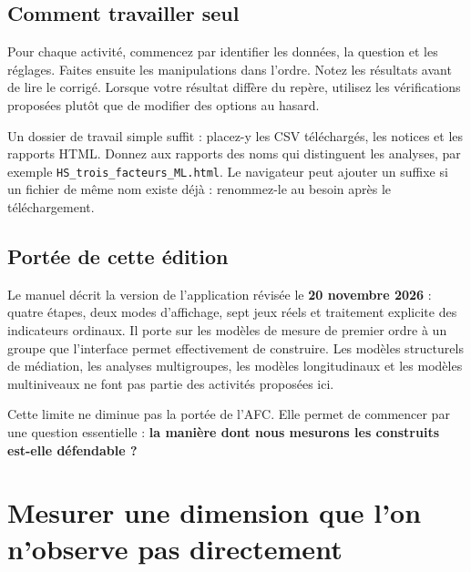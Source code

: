 \documentclass[
  french,
  11pt,
  a4paper,
  DIV=11,
  numbers=noendperiod]{scrreprt}
\begin{document}
\section*{Comment travailler seul}\label{comment-travailler-seul}


Pour chaque activité, commencez par identifier les données, la question
et les réglages. Faites ensuite les manipulations dans l'ordre. Notez
les résultats avant de lire le corrigé. Lorsque votre résultat diffère
du repère, utilisez les vérifications proposées plutôt que de modifier
des options au hasard.

Un dossier de travail simple suffit : placez-y les CSV téléchargés, les
notices et les rapports HTML. Donnez aux rapports des noms qui
distinguent les analyses, par exemple
\texttt{HS\_trois\_facteurs\_ML.html}. Le navigateur peut ajouter un
suffixe si un fichier de même nom existe déjà : renommez-le au besoin
après le téléchargement.

\section*{Portée de cette édition}\label{portuxe9e-de-cette-uxe9dition}


Le manuel décrit la version de l'application révisée le \textbf{20
novembre 2026} : quatre étapes, deux modes d'affichage, sept jeux réels
et traitement explicite des indicateurs ordinaux. Il porte sur les
modèles de mesure de premier ordre à un groupe que l'interface permet
effectivement de construire. Les modèles structurels de médiation, les
analyses multigroupes, les modèles longitudinaux et les modèles
multiniveaux ne font pas partie des activités proposées ici.

Cette limite ne diminue pas la portée de l'AFC. Elle permet de commencer
par une question essentielle : \textbf{la manière dont nous mesurons les
construits est-elle défendable ?}


\chapter{Mesurer une dimension que l'on n'observe pas
directement}\label{sec-mesurer}
\end{document}
